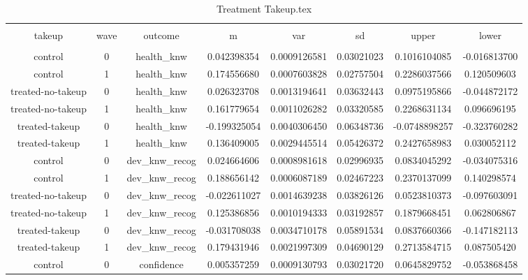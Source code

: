 
\begin{table}[!htbp] \centering 
  \caption{Treatment Takeup.tex} 
  \label{tbl:Treatment Takeup.tex} 
\begin{tabular}{@{\extracolsep{5pt}} cccccccc} 
\\[-1.8ex]\hline 
\hline \\[-1.8ex] 
takeup & wave & outcome & m & var & sd & upper & lower \\ 
\hline \\[-1.8ex] 
control & 0 & health\_knw &  0.042398354 & 0.0009126581 & 0.03021023 &  0.1016104085 & -0.016813700 \\ 
control & 1 & health\_knw &  0.174556680 & 0.0007603828 & 0.02757504 &  0.2286037566 &  0.120509603 \\ 
treated-no-takeup & 0 & health\_knw &  0.026323708 & 0.0013194641 & 0.03632443 &  0.0975195866 & -0.044872172 \\ 
treated-no-takeup & 1 & health\_knw &  0.161779654 & 0.0011026282 & 0.03320585 &  0.2268631134 &  0.096696195 \\ 
treated-takeup & 0 & health\_knw & -0.199325054 & 0.0040306450 & 0.06348736 & -0.0748898257 & -0.323760282 \\ 
treated-takeup & 1 & health\_knw &  0.136409005 & 0.0029445514 & 0.05426372 &  0.2427658983 &  0.030052112 \\ 
control & 0 & dev\_knw\_recog &  0.024664606 & 0.0008981618 & 0.02996935 &  0.0834045292 & -0.034075316 \\ 
control & 1 & dev\_knw\_recog &  0.188656142 & 0.0006087189 & 0.02467223 &  0.2370137099 &  0.140298574 \\ 
treated-no-takeup & 0 & dev\_knw\_recog & -0.022611027 & 0.0014639238 & 0.03826126 &  0.0523810373 & -0.097603091 \\ 
treated-no-takeup & 1 & dev\_knw\_recog &  0.125386856 & 0.0010194333 & 0.03192857 &  0.1879668451 &  0.062806867 \\ 
treated-takeup & 0 & dev\_knw\_recog & -0.031708038 & 0.0034710178 & 0.05891534 &  0.0837660366 & -0.147182113 \\ 
treated-takeup & 1 & dev\_knw\_recog &  0.179431946 & 0.0021997309 & 0.04690129 &  0.2713584715 &  0.087505420 \\ 
control & 0 & confidence &  0.005357259 & 0.0009130793 & 0.03021720 &  0.0645829752 & -0.053868458 \\ 

\end{tabular}
\end{table}
